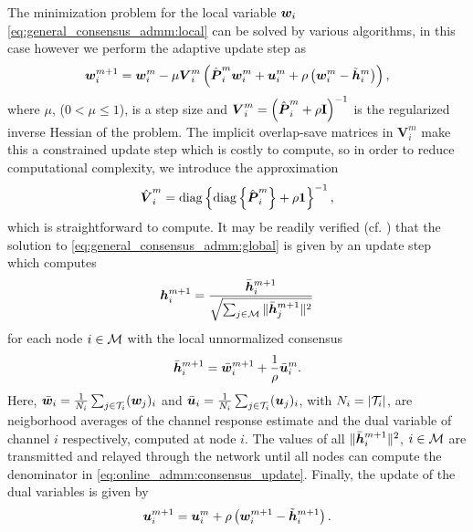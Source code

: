 \documentclass{article}
\begin{document}
The minimization problem for the local variable \({\bm{w}}_i\) \eqref{eq:general_consensus_admm:local} can be solved by various algorithms, in this case however we perform the adaptive update step as
\begin{equation}
    {\bm{w}}_i^{m+1} = {\bm{w}}_i^{m} - \mu \bm{{V}}_i^m \left( \hat{{\bm{{P}}}}_i^m {\bm{w}}_i^m + {\bm{u}}_i^m + \rho\left({\bm{w}}_i^m - \tilde{{\bm{h}}}_i^{m}\right)\right),\label{eq:online_admm:local_update}
\end{equation}
where \(\mu\), (\(0  < \mu\leq 1\)), is a step size and \(\bm{{V}}_i^m = \left(\hat{{\bm{{P}}}}_i^m + \rho \bm{\mathrm{I}} \right)^{-1}\) is the regularized inverse Hessian of the problem.
The implicit overlap-save matrices in \(\bm{{V}}_i^m\) make this a constrained update step which is costly to compute, so in order to reduce computational complexity, we introduce the approximation
\begin{equation}
    \hat{\bm{{V}}}_i^m = \operatorname{diag} \left\{ \operatorname{diag} \left\{ \hat{{\bm{{P}}}}_i^m \right\} + \rho \bm{\mathrm{1}} \right\}^{-1},
\end{equation}
which is straightforward to compute.
It may be readily verified (cf. \cite{boydDistributedOptimizationStatistical2011}) that the solution to \eqref{eq:general_consensus_admm:global} is given by an update step which computes
\begin{equation}
    {\bm{h}}_i^{m+1} = \frac{\bar{{\bm{h}}}_i^{m+1}}{\sqrt{\sum_{j \in \mathcal{M}} \|\bar{{\bm{h}}}_j^{m+1}\|^2}}\label{eq:online_admm:consensus_update}
\end{equation}
for each node \(i \in \mathcal{M}\) with the local unnormalized consensus
\begin{equation}
    \bar{{\bm{h}}}_i^{m+1} = \bar{{\bm{w}}}_i^{m+1} + \frac{1}{\rho} \bar{{\bm{u}}}_i^{m}.
\end{equation}
Here, \(\bar{{\bm{w}}}_i = \frac{1}{N_i} \sum_{j \in \mathcal{T}_i} ({\bm{w}}_j)_i\) and \(\bar{{\bm{u}}}_i = \frac{1}{N_i} \sum_{j \in \mathcal{T}_i} ({\bm{u}}_j)_i\), with \(N_i = | \mathcal{T}_i |\), are neigborhood averages of the channel response estimate and the dual variable of channel \(i\) respectively, computed at node \(i\). The values of all \(\|\bar{{\bm{h}}}_i^{m+1}\|^2\), \(i \in \mathcal{M}\) are transmitted and relayed through the network until all nodes can compute the denominator in \eqref{eq:online_admm:consensus_update}.
Finally, the update of the dual variables is given by
\begin{equation}
    {\bm{u}}_i^{m+1} = {\bm{u}}_i^{m} + \rho \left( {\bm{w}}_i^{m+1} - \tilde{{\bm{h}}}_i^{m+1} \right).\label{eq:online_admm:dual_update}
\end{equation}
\end{document}

